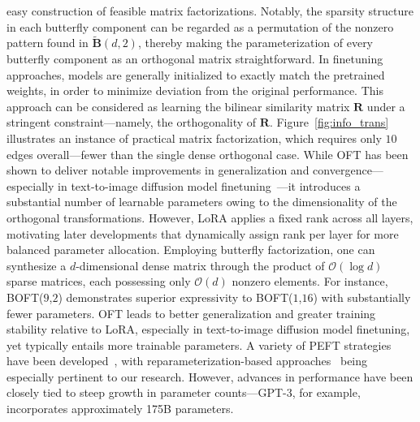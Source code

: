 easy construction of feasible matrix factorizations. Notably, the sparsity structure in each butterfly component can be regarded as a permutation of the nonzero pattern found in $\tilde{\bm{B}}(d,2)$, thereby making the parameterization of every butterfly component as an orthogonal matrix straightforward. In finetuning approaches, models are generally initialized to exactly match the pretrained weights, in order to minimize deviation from the original performance. This approach can be considered as learning the bilinear similarity matrix $\bm{R}$ under a stringent constraint—namely, the orthogonality of $\bm{R}$. Figure~\ref{fig:info_trans} illustrates an instance of practical matrix factorization, which requires only $10$ edges overall—fewer than the single dense orthogonal case. While OFT has been shown to deliver notable improvements in generalization and convergence—especially in text-to-image diffusion model finetuning~\cite{qiu2023controlling}—it introduces a substantial number of learnable parameters owing to the dimensionality of the orthogonal transformations. However, LoRA applies a fixed rank across all layers, motivating later developments \cite{zhang2022adaptive,valipour2022dylora,zhang2023increlora} that dynamically assign rank per layer for more balanced parameter allocation. Employing butterfly factorization, one can synthesize a $d$-dimensional dense matrix through the product of $\mathcal{O}(\log d)$ sparse matrices, each possessing only $\mathcal{O}(d)$ nonzero elements. For instance, BOFT($9$,$2$) demonstrates superior expressivity to BOFT($1$,$16$) with substantially fewer parameters. OFT leads to better generalization and greater training stability relative to LoRA, especially in text-to-image diffusion model finetuning, yet typically entails more trainable parameters. A variety of PEFT strategies have been developed~\cite{houlsby2019parameter,aghajanyan2020intrinsic,hulora2022,edalati2022krona,wang2022adamix,gheini2021cross,zaken2022bitfit,guo2020parameter,sung2021training,ansell2022composable,lester2021power,li2021prefix,vu2022spot,he2021towards,mao2021unipelt,karimi2021compacter,liu2022few,sung2022lst,chen2022parameter,jia2022visual,chen2022adaptformer,zhang2022neural,jie2023fact,lian2022scaling,luo2023towards}, with reparameterization-based approaches~\cite{aghajanyan2020intrinsic,hulora2022,edalati2022krona} being especially pertinent to our research. However, advances in performance have been closely tied to steep growth in parameter counts—GPT-3, for example, incorporates approximately 175B parameters. 
